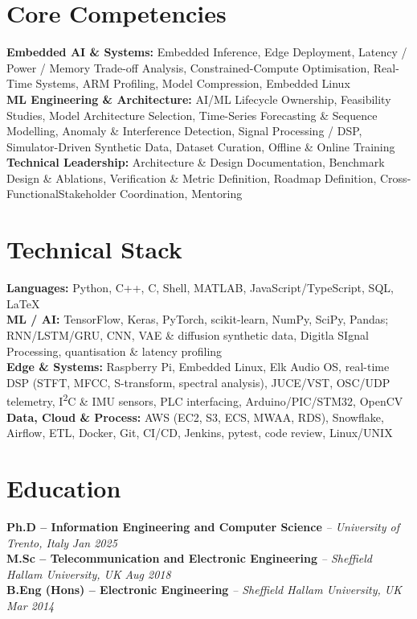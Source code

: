 \documentclass[11pt]{article}
\begin{document}
\section*{Core Competencies}
 
\textbf{Embedded AI \& Systems:} Embedded Inference, Edge Deployment, Latency / Power / Memory Trade-off Analysis, Constrained-Compute Optimisation, Real-Time Systems, ARM Profiling, Model Compression, Embedded Linux\\
\textbf{ML Engineering \& Architecture:} AI/ML Lifecycle Ownership, Feasibility Studies, Model Architecture Selection, Time-Series Forecasting \& Sequence Modelling, Anomaly \& Interference Detection, Signal Processing / DSP, Simulator-Driven Synthetic Data, Dataset Curation, Offline \& Online Training\\
\textbf{Technical Leadership:} Architecture \& Design Documentation, Benchmark Design \& Ablations, Verification \& Metric Definition, Roadmap Definition, Cross-FunctionalStakeholder Coordination, Mentoring
 
\section*{Technical Stack}
 
\textbf{Languages:} Python, C++, C, Shell, MATLAB, JavaScript/TypeScript, SQL, LaTeX\\
\textbf{ML / AI:} TensorFlow, Keras, PyTorch, scikit-learn, NumPy, SciPy, Pandas; RNN/LSTM/GRU, CNN, VAE \& diffusion synthetic data, Digitla SIgnal Processing, quantisation \& latency profiling\\
\textbf{Edge \& Systems:} Raspberry Pi, Embedded Linux, Elk Audio OS, real-time DSP (STFT, MFCC, S-transform, spectral analysis), JUCE/VST, OSC/UDP telemetry, I\textsuperscript{2}C \& IMU sensors, PLC interfacing, Arduino/PIC/STM32, OpenCV\\
\textbf{Data, Cloud \& Process:} AWS (EC2, S3, ECS, MWAA, RDS), Snowflake, Airflow, ETL, Docker, Git, CI/CD, Jenkins, pytest, code review, Linux/UNIX\\

 \vspace{-1em}
\section*{Education}
\textbf{Ph.D -- Information Engineering and Computer Science} \textit{\small{ -- University of Trento, Italy}} \hfill \textit{Jan 2025}\\[2pt]
\noindent\textbf{M.Sc -- Telecommunication and Electronic Engineering} \textit{\small{ -- Sheffield Hallam University, UK}} \hfill \textit{Aug 2018}\\[2pt]
\noindent\textbf{B.Eng (Hons) -- Electronic Engineering} \textit{\small{ -- Sheffield Hallam University, UK}} \hfill \textit{Mar 2014}
 
\end{document}
